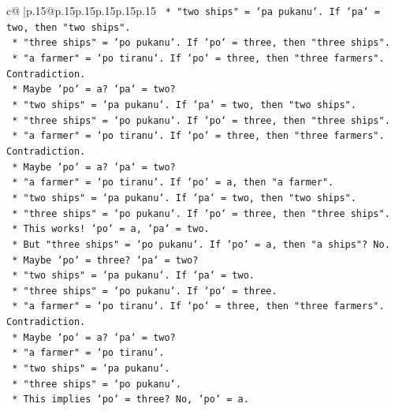 \documentclass{article}
\begin{document}
{\begin{supertabular}{c@{$\;$}|p{.15\linewidth}@{}p{.15\linewidth}p{.15\linewidth}p{.15\linewidth}p{.15\linewidth}p{.15\linewidth}}
{{{\texttt{                *   "two ships" = `pa pukanu`. If `pa` = two, then "two ships".} \\
\texttt{                *   "three ships" = `po pukanu`. If `po` = three, then "three ships".} \\
\texttt{                *   "a farmer" = `po tiranu`. If `po` = three, then "three farmers". Contradiction.} \\
\texttt{                *   Maybe `po` = a? `pa` = two?} \\
\texttt{                *   "two ships" = `pa pukanu`. If `pa` = two, then "two ships".} \\
\texttt{                *   "three ships" = `po pukanu`. If `po` = three, then "three ships".} \\
\texttt{                *   "a farmer" = `po tiranu`. If `po` = three, then "three farmers". Contradiction.} \\
\texttt{                *   Maybe `po` = a? `pa` = two?} \\
\texttt{                *   "a farmer" = `po tiranu`. If `po` = a, then "a farmer".} \\
\texttt{                *   "two ships" = `pa pukanu`. If `pa` = two, then "two ships".} \\
\texttt{                *   "three ships" = `po pukanu`. If `po` = three, then "three ships".} \\
\texttt{                *   This works! `po` = a, `pa` = two.} \\
\texttt{                *   But "three ships" = `po pukanu`. If `po` = a, then "a ships"? No.} \\
\texttt{                *   Maybe `po` = three? `pa` = two?} \\
\texttt{                *   "two ships" = `pa pukanu`. If `pa` = two.} \\
\texttt{                *   "three ships" = `po pukanu`. If `po` = three.} \\
\texttt{                *   "a farmer" = `po tiranu`. If `po` = three, then "three farmers". Contradiction.} \\
\texttt{                *   Maybe `po` = a? `pa` = two?} \\
\texttt{                *   "a farmer" = `po tiranu`.} \\
\texttt{                *   "two ships" = `pa pukanu`.} \\
\texttt{                *   "three ships" = `po pukanu`.} \\
\texttt{                *   This implies `po` = three? No, `po` = a.} \\
}}}
\end{supertabular}}
\end{document}
